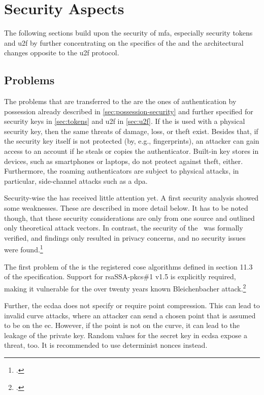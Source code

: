 \section{Security Aspects}

The following sections build upon the security of \gls{mfa}, especially security tokens and \gls{u2f} by further concentrating on the specifics of the \wa{} and the architectural changes opposite to the \gls{u2f} protocol.

\subsection{Problems}

The problems that are transferred to the \wa{} are the ones of authentication by possession already described in \autoref{sec:possession-security} and further specified for security keys in \autoref{sec:tokens} and \gls{u2f} in \autoref{sec:u2f}. If the \wa{} is used with a physical security key, then the same threats of damage, loss, or theft exist. Besides that, if the security key itself is not protected (by, e.g., fingerprints), an attacker can gain access to an account if he steals or copies the authenticator. Built-in key stores in devices, such as smartphones or laptops, do not protect against theft, either. Furthermore, the roaming authenticators are subject to physical attacks, in particular, side-channel attacks such as a \gls{dpa}.

Security-wise the \wa{} has received little attention yet. A first security analysis showed some weaknesses. These are described in more detail below. It has to be noted though, that these security considerations are only from one source and outlined only theoretical attack vectors. In contrast, the security of the \wa{} was formally verified, and findings only resulted in privacy concerns, and no security issues were found.\footcites[See][]{paragon-webauth}[See][9]{FormalVerificationWebAuthn}

The first problem of the \wa{} is the registered \gls{cose} algorithms defined in section 11.3 of the specification. Support for \gls{rsa}SSA-\gls{pkcs}\#1 v1.5 is explicitly required, making it vulnerable for the over twenty years known \frqq Bleichenbacher attack\flqq.\footcites[See][]{10.1007/BFb0055716}[See][Chapter 11.3]{w3c}

Further, the \gls{ecdaa} does not specify or require point compression. This can lead to invalid curve attacks, where an attacker can send a chosen point that is assumed to be on the \gls{ec}. However, if the point is not on the curve, it can lead to the leakage of the private key. Random values for the secret key in \gls{ecdsa} expose a threat, too. It is recommended to use determinist \glspl{nonce} instead.

